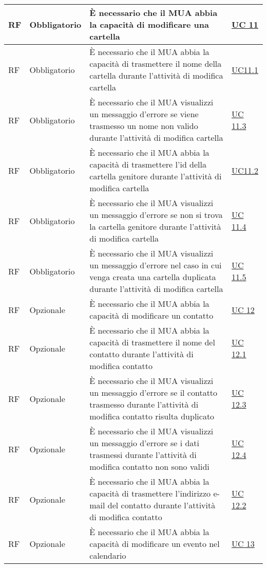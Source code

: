 \begin{longtable}{*{1}{>{\centering\arraybackslash}p{1.5cm}}*{1}{>{\centering\arraybackslash}p{2.5cm}}p{6cm}*{1}{>{\centering\arraybackslash}p{3cm}}}
    \\\hline
    RF & Obbligatorio & È necessario che il MUA abbia la capacità di modificare una cartella & \hyperref[sec:UC11]{UC 11}
    \\\hline
    RF & Obbligatorio & È necessario che il MUA abbia la capacità di trasmettere il nome della cartella durante l'attività di modifica cartella & \hyperref[sec:UC11.1]{UC11.1}
    \\\hline
    RF & Obbligatorio & È necessario che il MUA visualizzi un messaggio d'errore se viene trasmesso un nome non valido durante l'attività di modifica cartella & \hyperref[sec:UC11.3]{UC 11.3}
    \\\hline
    RF & Obbligatorio & È necessario che il MUA abbia la capacità di trasmettere l'id della cartella genitore durante l'attività di modifica cartella & \hyperref[sec:UC11.2]{UC11.2}
    \\\hline
    RF & Obbligatorio & È necessario che il MUA visualizzi un messaggio d'errore se non si trova la cartella genitore durante l'attività di modifica cartella & \hyperref[sec:UC11.4]{UC 11.4}
    \\\hline
    RF & Obbligatorio & È necessario che il MUA visualizzi un messaggio d'errore nel caso in cui venga creata una cartella duplicata durante l'attività di modifica cartella & \hyperref[sec:UC11.5]{UC 11.5}
    \\\hline
    RF & Opzionale & È necessario che il MUA abbia la capacità di modificare un contatto & \hyperref[sec:UC12]{UC 12}
    \\\hline
    RF & Opzionale & È necessario che il MUA abbia la capacità di trasmettere il nome del contatto durante l'attività di modifica contatto & \hyperref[sec:UC12.1]{UC 12.1}
    \\\hline
    RF & Opzionale & È necessario che il MUA visualizzi un messaggio d'errore se il contatto trasmesso durante l'attività di modifica contatto risulta duplicato & \hyperref[sec:UC12.3]{UC 12.3}
    \\\hline
    RF & Opzionale & È necessario che il MUA visualizzi un messaggio d'errore se i dati trasmessi durante l'attività di modifica contatto non sono validi & \hyperref[sec:UC12.4]{UC 12.4}
    \\\hline
    RF & Opzionale & È necessario che il MUA abbia la capacità di trasmettere l'indirizzo e-mail del contatto durante l'attività di modifica contatto & \hyperref[sec:UC12.2]{UC 12.2}
    \\\hline
    RF & Opzionale & È necessario che il MUA abbia la capacità di modificare un evento nel calendario & \hyperref[sec:UC13]{UC 13}

\end{longtable}
